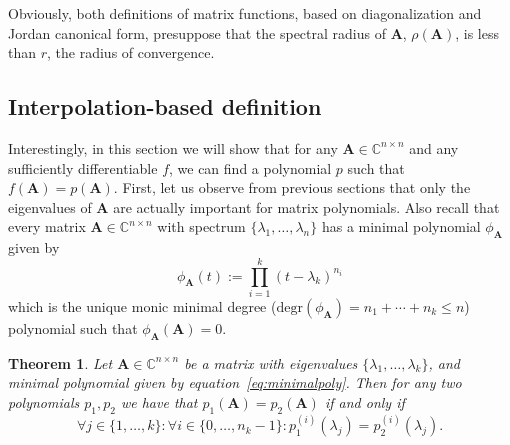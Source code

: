 \documentclass[11pt]{article}
\newtheorem{theorem}{Theorem}
\numberwithin{equation}{section}
\begin{document}
Obviously, both definitions of matrix functions, based on diagonalization and Jordan canonical form, presuppose that the spectral radius of $\mathbf{A}$, $\rho(\mathbf{A})$, is less than $r$, the radius of convergence.
\subsection{Interpolation-based definition}
Interestingly, in this section we will show that for any $\mathbf{A}\in\mathbb{C}^{n\times n}$ and any sufficiently differentiable $f$, we can find a polynomial $p$ such that $f(\mathbf{A})=p(\mathbf{A})$. First, let us observe from previous sections that only the eigenvalues of $\mathbf{A}$ are actually important for matrix polynomials. Also recall that every matrix $\mathbf{A}\in\mathbb{C}^{n\times n}$ with spectrum $\{\lambda_1,\dots,\lambda_n\}$ has a minimal polynomial $\phi_{\mathbf{A}}$ given by
\begin{equation}\label{eq:minimalpoly}
\phi_{\mathbf{A}}(t):=\prod_{i=1}^{k}(t-\lambda_k)^{n_i}
\end{equation}
which is the unique monic minimal degree ($\text{degr}(\phi_{\mathbf{A}})=n_1+\cdots+n_k\leq n$) polynomial such that $\phi_{\mathbf{A}}(\mathbf{A})=0$.
\begin{theorem}\label{thm:unicity}
Let $\mathbf{A}\in \mathbb{C}^{n\times n}$ be a matrix with eigenvalues $\{\lambda_1,\ldots,\lambda_k\}$, and minimal polynomial given by equation~\ref{eq:minimalpoly}. Then for any two polynomials $p_1,p_2$ we have that $p_1(\mathbf{A})=p_2(\mathbf{A})$ if and only if 
$$\forall j\in\{1,\ldots,k\}:\forall i\in\{0,\ldots,n_k-1\}: p_1^{(i)}(\lambda_j)=p_2^{(i)}(\lambda_j).$$
\end{theorem}
\end{document}

